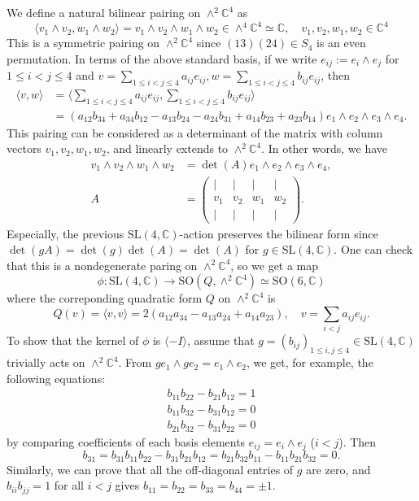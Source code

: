 \documentclass{article}
\newcommand{\bC}{\mathbb{C}}
\newcommand{\SO}{\mathrm{SO}}
\newcommand{\SL}{\mathrm{SL}}
\begin{document}
We define a natural bilinear pairing on $\wedge^2\bC^4$ as 
$$
\langle v_{1}\wedge v_{2}, w_{1}\wedge w_{2}\rangle = v_{1}\wedge v_{2}\wedge w_{1}\wedge w_{2}\in \wedge^{4}\mathbb{C}^{4}\simeq \mathbb{C}, \quad v_{1}, v_{2}, w_{1}, w_{2}\in \mathbb{C}^{4}
$$
This is a symmetric pairing on $\wedge^{2}\mathbb{C}^{4}$ since $(13)(24)\in S_{4}$ is an even permutation. 
In terms of the above standard basis, if we write $e_{ij} := e_i \wedge e_j$ for $1 \leq i < j \leq 4$ and $v = \sum_{1 \leq i < j \leq 4} a_{ij} e_{ij}, w = \sum_{1 \leq i < j \leq 4} b_{ij} e_{ij}$, then
\begin{align*}
    \langle v, w \rangle &= \langle \sum_{1 \leq i < j \leq 4} a_{ij} e_{ij}, \sum_{1 \leq i < j \leq 4} b_{ij} e_{ij} \rangle \\
    &= (a_{12}b_{34} + a_{34}b_{12} - a_{13} b_{24} - a_{24}b_{31} + a_{14}b_{23} + a_{23} b_{14}) e_{1} \wedge e_{2} \wedge e_{3} \wedge e_{4}.
\end{align*}
This pairing can be considered as a determinant of the matrix with column vectors $v_{1}, v_{2}, w_{1}, w_{2}$, and linearly extends to $\wedge^{2}\mathbb{C}^{4}$.
In other words, we have
\begin{align*}
    v_1 \wedge v_2 \wedge w_1 \wedge w_2 &= \det(A) e_1 \wedge e_2 \wedge e_3 \wedge e_4, \\
    A &= \begin{pmatrix}
        | & | & | & | \\
        v_1 & v_2 & w_1 & w_2 \\
        | & | & | & |
    \end{pmatrix}.
\end{align*}
Especially, the previous $\SL(4, \bC)$-action preserves the bilinear form since $\det(gA) = \det(g) \det(A) = \det(A)$ for $g \in \SL(4, \bC)$.
One can check that this is a nondegenerate paring on $\wedge^{2}\mathbb{C}^{4}$, so we get a map 
$$
\phi:\SL(4, \mathbb{C})\to \SO(Q, \wedge^{2}\mathbb{C}^{4}) \simeq \SO(6, \mathbb{C}) 
$$
where the correponding quadratic form $Q$ on $\wedge^{2}\mathbb{C}^{4}$ is
$$
Q(v) = \langle v, v\rangle = 2(a_{12}a_{34}-a_{13}a_{24}+a_{14}a_{23}), \quad v = \sum_{i<j}a_{ij}e_{ij}. 
$$
To show that the kernel of $\phi$ is $\langle -I\rangle$, assume that $g = (b_{ij})_{1\leq i, j\leq 4}\in \SL(4, \mathbb{C})$ trivially acts on $\wedge^{2}\mathbb{C}^{4}$. From $ge_{1}\wedge ge_{2} = e_{1}\wedge e_{2}$, we get, for example, the following equations:
\begin{align*}
b_{11}b_{22}-b_{21}b_{12} = 1 \\
b_{11}b_{32} - b_{31}b_{12} = 0 \\
b_{21}b_{32}-b_{31}b_{22} = 0
\end{align*}
by comparing coefficients of each basis elements $e_{ij} = e_{i}\wedge e_{j}$ ($i<j$). Then 
$$
b_{31} = b_{31}b_{11}b_{22} - b_{31}b_{21}b_{12} = b_{21}b_{32}b_{11} - b_{11}b_{21}b_{32} = 0.
$$
Similarly, we can prove that all the off-diagonal entries of $g$ are zero, and $b_{ii}b_{jj}  = 1$ for all $i<j$ gives $b_{11} = b_{22} = b_{33} = b_{44} = \pm 1$. 
\end{document}
